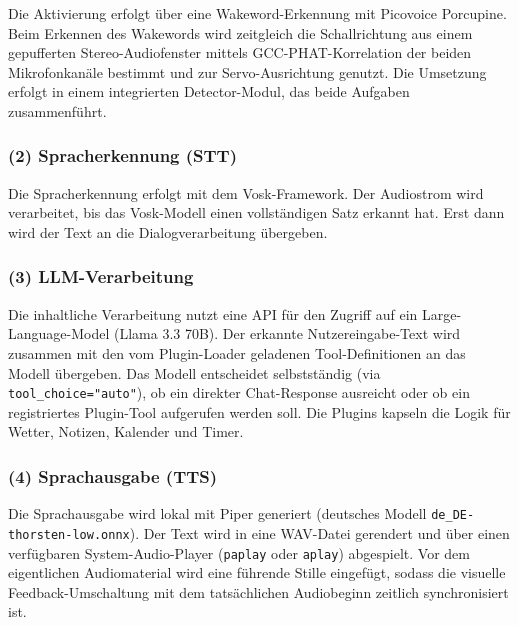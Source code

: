 Die Aktivierung erfolgt über eine Wakeword-Erkennung mit Picovoice Porcupine. 
Beim Erkennen des Wakewords wird zeitgleich die Schallrichtung aus einem gepufferten Stereo-Audiofenster mittels GCC-PHAT-Korrelation der beiden Mikrofonkanäle bestimmt und zur Servo-Ausrichtung genutzt. 
Die Umsetzung erfolgt in einem integrierten Detector-Modul, das beide Aufgaben zusammenführt.


\subsubsection{(2) Spracherkennung (STT)}

Die Spracherkennung erfolgt mit dem Vosk-Framework. 
Der Audiostrom wird verarbeitet, bis das Vosk-Modell einen vollständigen Satz erkannt hat. 
Erst dann wird der Text an die Dialogverarbeitung übergeben.


\subsubsection{(3) LLM-Verarbeitung}

Die inhaltliche Verarbeitung nutzt eine API für den Zugriff auf ein Large-Language-Model (Llama 3.3 70B). 
Der erkannte Nutzereingabe-Text wird zusammen mit den vom Plugin-Loader geladenen Tool-Definitionen an das Modell übergeben. 
Das Modell entscheidet selbstständig (via \texttt{tool\_choice="auto"}), ob ein direkter Chat-Response ausreicht oder ob ein registriertes Plugin-Tool aufgerufen werden soll. 
Die Plugins kapseln die Logik für Wetter, Notizen, Kalender und Timer.


\subsubsection{(4) Sprachausgabe (TTS)}

Die Sprachausgabe wird lokal mit Piper generiert (deutsches Modell \texttt{de\_DE-thorsten-low.onnx}). 
Der Text wird in eine WAV-Datei gerendert und über einen verfügbaren System-Audio-Player (\texttt{paplay} oder \texttt{aplay}) abgespielt. 
Vor dem eigentlichen Audiomaterial wird eine führende Stille eingefügt, sodass die visuelle Feedback-Umschaltung mit dem tatsächlichen Audiobeginn zeitlich synchronisiert ist.


